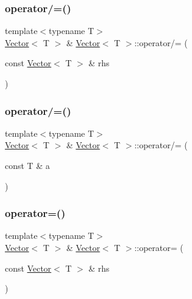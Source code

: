 \subsubsection{\texorpdfstring{operator/=()}{operator/=()}\hspace{0.1cm}{\footnotesize\ttfamily [1/2]}}
{\footnotesize\ttfamily template$<$typename T$>$ \\
\mbox{\hyperlink{classVector}{Vector}}$<$ T $>$ \& \mbox{\hyperlink{classVector}{Vector}}$<$ T $>$\+::operator/= (\begin{DoxyParamCaption}\item[{const \mbox{\hyperlink{classVector}{Vector}}$<$ T $>$ \&}]{rhs }\end{DoxyParamCaption})\hspace{0.3cm}{\ttfamily [inline]}}

\mbox{\label{classVector_a358eca4649d02b3bbab359484eb93140_a358eca4649d02b3bbab359484eb93140}} 
\subsubsection{\texorpdfstring{operator/=()}{operator/=()}\hspace{0.1cm}{\footnotesize\ttfamily [2/2]}}
{\footnotesize\ttfamily template$<$typename T$>$ \\
\mbox{\hyperlink{classVector}{Vector}}$<$ T $>$ \& \mbox{\hyperlink{classVector}{Vector}}$<$ T $>$\+::operator/= (\begin{DoxyParamCaption}\item[{const T \&}]{a }\end{DoxyParamCaption})\hspace{0.3cm}{\ttfamily [inline]}}

\mbox{\label{classVector_aa44e8e04a723f2c0bd9382a3bfa46e7c_aa44e8e04a723f2c0bd9382a3bfa46e7c}} 
\subsubsection{\texorpdfstring{operator=()}{operator=()}\hspace{0.1cm}{\footnotesize\ttfamily [1/2]}}
{\footnotesize\ttfamily template$<$typename T$>$ \\
\mbox{\hyperlink{classVector}{Vector}}$<$ T $>$ \& \mbox{\hyperlink{classVector}{Vector}}$<$ T $>$\+::operator= (\begin{DoxyParamCaption}\item[{const \mbox{\hyperlink{classVector}{Vector}}$<$ T $>$ \&}]{rhs }\end{DoxyParamCaption})\hspace{0.3cm}{\ttfamily [inline]}}

